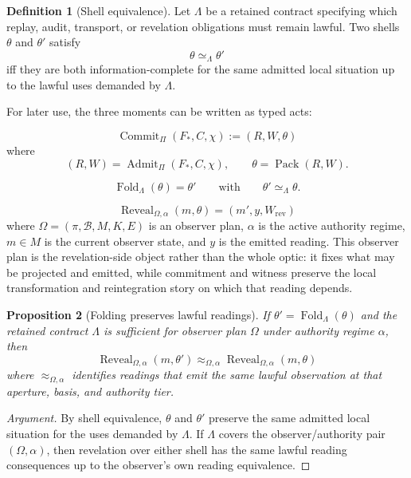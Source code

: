 \documentclass[11pt]{article}
\theoremstyle{definition}
\newtheorem{definition}{Definition}[section]
\theoremstyle{plain}
\newtheorem{proposition}[definition]{Proposition}
\theoremstyle{remark}
\newenvironment{argument}{\begin{proof}[Argument]}{\end{proof}}
\begin{document}
\begin{definition}[Shell equivalence]
Let \(\Lambda\) be a retained contract specifying which replay, audit,
transport, or revelation obligations must remain lawful. Two shells
\(\theta\) and \(\theta'\) satisfy
\[
\theta \simeq_{\Lambda} \theta'
\]
iff they are both information-complete for the same admitted local situation up
to the lawful uses demanded by \(\Lambda\).
\end{definition}

For later use, the three moments can be written as typed acts:

\[
\operatorname{Commit}_{\Pi}(F_*, C, \chi)
:=
(R, W, \theta)
\]
where
\[
(R, W) = \operatorname{Admit}_{\Pi}(F_*, C, \chi),
\qquad
\theta = \operatorname{Pack}(R, W).
\]

\[
\operatorname{Fold}_{\Lambda}(\theta) = \theta'
\qquad
\text{with}
\qquad
\theta' \simeq_{\Lambda} \theta.
\]

\[
\operatorname{Reveal}_{\Omega,\alpha}(m,\theta)
=
(m', y, W_{\mathrm{rev}})
\]
where \(\Omega = (\pi,\mathcal{B}, M, K, E)\) is an observer plan, \(\alpha\)
is the active authority regime, \(m \in M\) is the current observer state, and
\(y\) is the emitted reading.
This observer plan is the revelation-side object rather than the whole optic:
it fixes what may be projected and emitted, while commitment and witness
preserve the local transformation and reintegration story on which that reading
depends.

\begin{proposition}[Folding preserves lawful readings]
If \(\theta' = \operatorname{Fold}_{\Lambda}(\theta)\) and the retained
contract \(\Lambda\) is sufficient for observer plan \(\Omega\) under authority
regime \(\alpha\), then
\[
\operatorname{Reveal}_{\Omega,\alpha}(m,\theta')
\approx_{\Omega,\alpha}
\operatorname{Reveal}_{\Omega,\alpha}(m,\theta)
\]
where \(\approx_{\Omega,\alpha}\) identifies readings that emit the same lawful
observation at that aperture, basis, and authority tier.
\end{proposition}

\begin{argument}
By shell equivalence, \(\theta\) and \(\theta'\) preserve the same admitted
local situation for the uses demanded by \(\Lambda\). If \(\Lambda\) covers the
observer/authority pair \((\Omega,\alpha)\), then revelation over either shell
has the same lawful reading consequences up to the observer's own reading
equivalence.
\end{argument}
\end{document}
